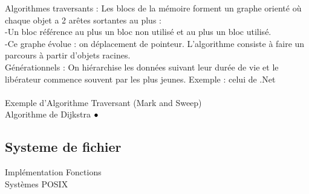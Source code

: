 \documentclass[5pt]{article}
\newcommand\tab[1][1cm]{\hspace*{#1}}
\begin{document}
\begin{scriptsize}
Algorithmes traversants : Les blocs de la mémoire forment un graphe orienté où chaque objet a 2 arêtes sortantes au plus :\\
-Un bloc référence au plus un bloc non utilisé et au plus un bloc utilisé.\\
-Ce graphe évolue : on déplacement de pointeur. L’algorithme consiste à faire un parcours à partir d’objets racines.\\
Générationnels : On hiérarchise les données suivant leur durée de vie et le libérateur commence souvent par les plus jeunes. Exemple : celui de .Net\\
\\
Exemple d’Algorithme Traversant (Mark and Sweep)\\
Algorithme de Dijkstra
$\bullet\tab$
\subsection{Systeme de fichier}
Implémentation Fonctions\\
Systèmes POSIX\\

\end{scriptsize}
\end{document}
